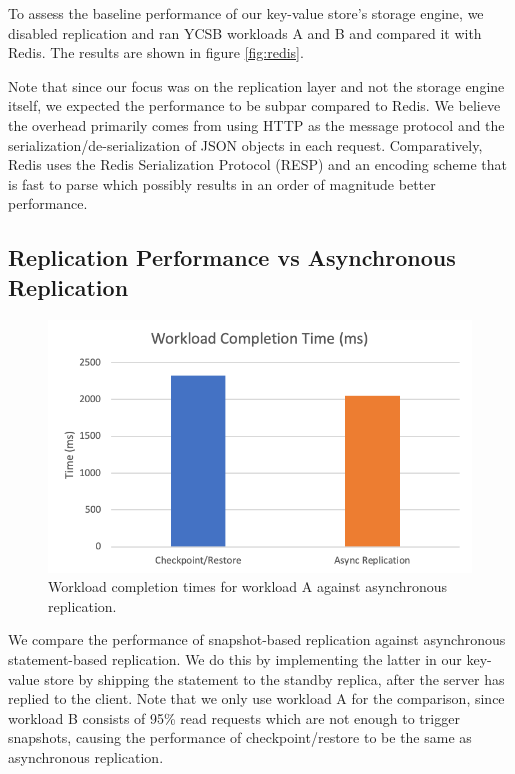 \documentclass[final]{proc}
\begin{document}
To assess the baseline performance of our key-value store's storage engine, we
disabled replication and ran YCSB workloads A and B and compared it with Redis.
The results are shown in figure \ref{fig:redis}.

Note that since our focus was on the replication layer and not the storage
engine itself, we expected the performance to be subpar compared to Redis. We
believe the overhead primarily comes from using HTTP as the message protocol and
the serialization/de-serialization of JSON objects in each request.
Comparatively, Redis uses the Redis Serialization Protocol (RESP)
\cite{RedisProtocol} and an encoding scheme that is fast to parse which possibly
results in an order of magnitude better performance.

\subsection{Replication Performance vs Asynchronous Replication}

\begin{figure}
  \centering
  \includegraphics[width=\columnwidth]{async-replication.png}

  \caption{Workload completion times for workload A against asynchronous replication.}
  \label{fig:async-completion}
\end{figure}

We compare the performance of snapshot-based replication against asynchronous
statement-based replication. We do this by implementing the latter in our
key-value store by shipping the statement to the standby replica, after the
server has replied to the client. Note that we only use workload A for the
comparison, since workload B consists of 95\% read requests which are not enough
to trigger snapshots, causing the performance of checkpoint/restore to be the
same as asynchronous replication.
\end{document}
